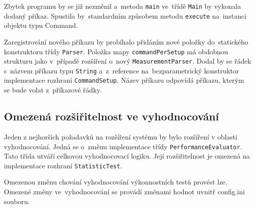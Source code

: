 Zbytek programu by se již nezměnil a~metoda \lstinline{main} ve~třídě \lstinline{Main} by vykonala dodaný příkaz. Spustila by~standardním způsobem
metodu \lstinline{execute} na~instanci objektu typu Command.

Zaregistrování nového příkazu by probíhalo přidáním nové položky do~statického konstruktoru třídy \lstinline{Parser}.
Položka mapy \lstinline{commandPerSetup} má obdobnou strukturu jako v~případě rozšíření o~nový \lstinline{MeasurementParser}.
Dodal by se řádek s~názvem příkazu typu \lstinline{String} a~z~reference na~bezparametrický konstruktor
implementace rozhraní \lstinline{CommandSetup}. Název příkazu odpovídá příkazu, kterým se bude volat z~příkazové řádky.

\subsection{Omezená rozšiřitelnost ve vyhodnocování}

Jeden z nejhorších požadavků na rozšíření systému by bylo rozšíření v oblasti vyhodnocování.
Jedná se o~změnu implementace třídy \lstinline{PerformanceEvaluator}. Tato třída utváří
celkovou vyhodnocovací logiku. Její rozšiřitelnost je omezená na implementace rozhraní
\lstinline{StatisticTest}.

Omezenou změnu chování vyhodnocování výkonnostních testů provést lze. Omezené změny ve~vyhodnocování
se provádí změnami hodnot uvnitř config.ini souboru.